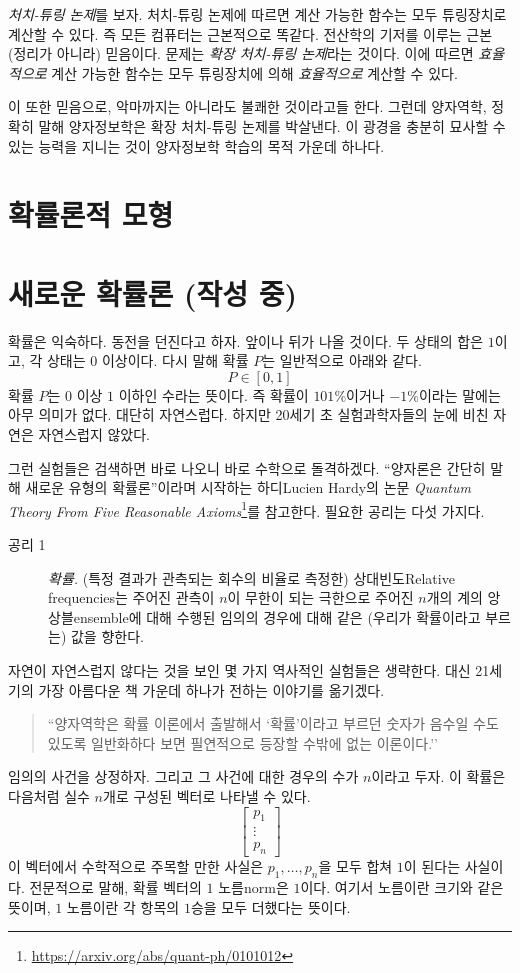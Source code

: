 \documentclass[a4paper,chapter,atbegshi]{oblivoir}
\begin{document}
\emph{처치-튜링 논제}를 보자. 처치-튜링 논제에 따르면 계산 가능한 함수는 모두
튜링장치로 계산할 수 있다. 즉 모든 컴퓨터는 근본적으로 똑같다. 전산학의
기저를 이루는 근본 (정리가 아니라) 믿음이다. 문제는 \emph{확장 처치-튜링 논제}라는
것이다. 이에 따르면 \emph{효율적으로} 계산 가능한 함수는 모두 튜링장치에 의해
\emph{효율적으로} 계산할 수 있다. 

이 또한 믿음으로, 악마까지는 아니라도 불쾌한 것이라고들 한다. 그런데 양자역학,
정확히 말해 양자정보학은 확장 처치-튜링 논제를 박살낸다. 이 광경을 충분히 묘사할
수 있는 능력을 지니는 것이 양자정보학 학습의 목적 가운데 하나다. 

\chapter{확률론적 모형}


\chapter{새로운 확률론 (작성 중)} 
확률은 익숙하다. 동전을 던진다고 하자. 앞이나 뒤가 나올 것이다. 두 상태의 합은
$1$이고, 각 상태는 $0$ 이상이다. 다시 말해 확률 $P$는 일반적으로 아래와 같다.
\[
  P\in[0,1]
\]
확률 $P$는 $0$ 이상 $1$ 이하인 수라는 뜻이다. 즉 확률이 $101\%$이거나 $-1\%$이라는
말에는 아무 의미가 없다. 대단히 자연스럽다. 하지만 20세기 초 실험과학자들의 눈에
비친 자연은 자연스럽지 않았다. 

그런 실험들은 검색하면 바로 나오니 바로 수학으로 돌격하겠다. ``양자론은 간단히
말해 새로운 유형의 확률론''이라며 시작하는 하디{\tiny Lucien Hardy}의 
논문 {\slshape Quantum Theory From Five Reasonable Axioms}\footnote{ 
\url{https://arxiv.org/abs/quant-ph/0101012}}를 참고한다. 필요한 공리는
다섯 가지다. 
\begin{description}
  \item[공리 1]\emph{확률.} (특정 결과가 관측되는 회수의 비율로 측정한)
    상대빈도{\tiny Relative frequencies}는 주어진 관측이 $n$이 무한이
    되는 극한으로 주어진 $n$개의 계의 
    앙상블{\tiny ensemble}에 대해 수행된 임의의 경우에 대해 같은
    (우리가 확률이라고 부르는) 값을 향한다. 
\end{description}

자연이 자연스럽지 않다는 것을 보인 몇 가지 역사적인 실험들은 생략한다. 대신
21세기의 가장 아름다운 책 가운데 하나가 전하는 이야기를 옮기겠다.
\begin{quote}
  ``양자역학은 확률 이론에서 출발해서 `확률'이라고 부르던 숫자가 음수일 수도
  있도록 일반화하다 보면 필연적으로 등장할 수밖에 없는 이론이다.''
\end{quote}
임의의 사건을 상정하자. 그리고 그 사건에 대한 경우의 수가 $n$이라고 두자.
이 확률은 다음처럼 실수 $n$개로 구성된 벡터로 나타낼 수 있다. 
\[
  \begin{bmatrix}p_1\\\vdots\\p_n\end{bmatrix}
\]
이 벡터에서 수학적으로 주목할 만한 사실은 $p_1,\ldots,p_n$을 모두 합쳐 $1$이
된다는 사실이다. 전문적으로 말해, 확률 벡터의 $1$ 노름{\tiny norm}은 $1$이다.
여기서 노름이란 크기와 같은 뜻이며, $1$ 노름이란 각 항목의 $1$승을 모두 더했다는 
뜻이다. 
\end{document}
